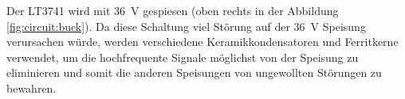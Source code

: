 Der  LT3741  wird mit \SI{36}{\volt} gespiesen (oben  rechts  in  der  Abbildung
\ref{fig:circuit:buck}).   Da   diese   Schaltung   viel   St\"orung   auf   der
\SI{36}{\volt}    Speisung     verursachen    w\"urde,    werden    verschiedene
Keramikkondensatoren  und  Ferritkerne  verwendet,  um die hochfrequente Signale
m\"oglichst von der Speisung zu eliminieren und somit die anderen Speisungen von
ungewollten St\"orungen zu bewahren.
